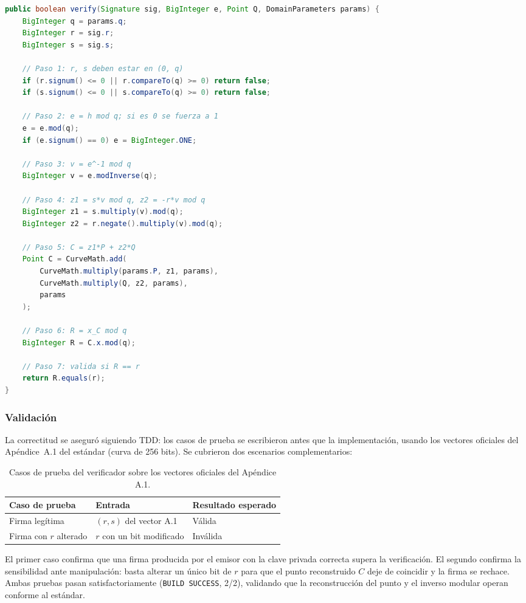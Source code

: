 \begin{lstlisting}[language=Java, caption={Método \texttt{verify} de la clase \texttt{GostVerifier}: los siete pasos del Algoritmo II.}]
public boolean verify(Signature sig, BigInteger e, Point Q, DomainParameters params) {
    BigInteger q = params.q;
    BigInteger r = sig.r;
    BigInteger s = sig.s;

    // Paso 1: r, s deben estar en (0, q)
    if (r.signum() <= 0 || r.compareTo(q) >= 0) return false;
    if (s.signum() <= 0 || s.compareTo(q) >= 0) return false;

    // Paso 2: e = h mod q; si es 0 se fuerza a 1
    e = e.mod(q);
    if (e.signum() == 0) e = BigInteger.ONE;

    // Paso 3: v = e^-1 mod q
    BigInteger v = e.modInverse(q);

    // Paso 4: z1 = s*v mod q, z2 = -r*v mod q
    BigInteger z1 = s.multiply(v).mod(q);
    BigInteger z2 = r.negate().multiply(v).mod(q);

    // Paso 5: C = z1*P + z2*Q
    Point C = CurveMath.add(
        CurveMath.multiply(params.P, z1, params),
        CurveMath.multiply(Q, z2, params),
        params
    );

    // Paso 6: R = x_C mod q
    BigInteger R = C.x.mod(q);

    // Paso 7: valida si R == r
    return R.equals(r);
}
\end{lstlisting}

\subsubsection{Validación}

La correctitud se aseguró siguiendo TDD: los casos de prueba se escribieron antes que la implementación, usando los vectores oficiales del Apéndice~A.1 del estándar (curva de 256 bits). Se cubrieron dos escenarios complementarios:

\begin{table}[H]
    \centering
    \begin{tabular}{@{}lll@{}}
        \toprule
        \textbf{Caso de prueba} & \textbf{Entrada} & \textbf{Resultado esperado} \\
        \midrule
        Firma legítima           & $(r, s)$ del vector A.1                 & Válida \\
        Firma con $r$ alterado    & $r$ con un bit modificado               & Inválida \\
        \bottomrule
    \end{tabular}
    \caption{Casos de prueba del verificador sobre los vectores oficiales del Apéndice A.1.}
    \label{tab:tests_verificador}
\end{table}

El primer caso confirma que una firma producida por el emisor con la clave privada correcta supera la verificación. El segundo confirma la sensibilidad ante manipulación: basta alterar un único bit de $r$ para que el punto reconstruido $C$ deje de coincidir y la firma se rechace. Ambas pruebas pasan satisfactoriamente (\texttt{BUILD SUCCESS}, 2/2), validando que la reconstrucción del punto y el inverso modular operan conforme al estándar.

